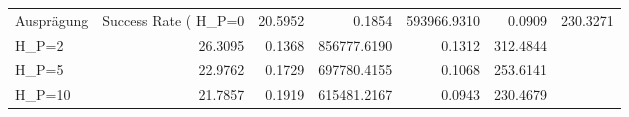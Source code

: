 \begin{tabular}{lrrrrr}
\toprule
Ausprägung & Success Rate (%
\midrule
H_P=0 & 20.5952 & 0.1854 & 593966.9310 & 0.0909 & 230.3271 \\
H_P=2 & 26.3095 & 0.1368 & 856777.6190 & 0.1312 & 312.4844 \\
H_P=5 & 22.9762 & 0.1729 & 697780.4155 & 0.1068 & 253.6141 \\
H_P=10 & 21.7857 & 0.1919 & 615481.2167 & 0.0943 & 230.4679 \\
\bottomrule
\end{tabular}
